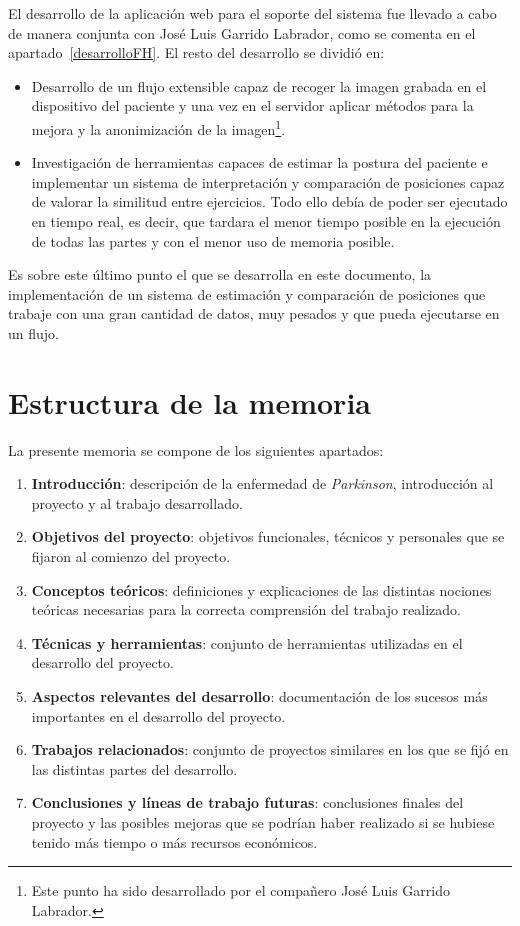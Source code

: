El desarrollo de la aplicación web para el soporte del sistema fue llevado a cabo de manera conjunta con José Luis Garrido Labrador, como se comenta en el apartado~\ref{desarrolloFH}. El resto del desarrollo se dividió en:
\begin{itemize}
	\item Desarrollo de un flujo extensible capaz de recoger la imagen grabada en el dispositivo del paciente y una vez en el servidor aplicar métodos para la mejora y la anonimización de la imagen\footnote{Este punto ha sido desarrollado por el compañero José Luis Garrido Labrador.}.
	\item Investigación de herramientas capaces de estimar la postura del paciente e implementar un sistema de interpretación y comparación de posiciones capaz de valorar la similitud entre ejercicios. Todo ello debía de poder ser ejecutado en tiempo real, es decir, que tardara el menor tiempo posible en la ejecución de todas las partes y con el menor uso de memoria posible.
\end{itemize}

Es sobre este último punto el que se desarrolla en este documento, la implementación de un sistema de estimación y comparación de posiciones que trabaje con una gran cantidad de datos, muy pesados y que pueda ejecutarse en un flujo.

\section{Estructura de la memoria}
La presente memoria se compone de los siguientes apartados:
\begin{enumerate}
	\item \textbf{Introducción}: descripción de la enfermedad de \textit{Parkinson}, introducción al proyecto y al trabajo desarrollado.
	\item \textbf{Objetivos del proyecto}: objetivos funcionales, técnicos y personales que se fijaron al comienzo del proyecto.
	\item \textbf{Conceptos teóricos}: definiciones y explicaciones de las distintas nociones teóricas necesarias para la correcta comprensión del trabajo realizado.
	\item \textbf{Técnicas y herramientas}: conjunto de herramientas utilizadas en el desarrollo del proyecto.
	\item \textbf{Aspectos relevantes del desarrollo}: documentación de los sucesos más importantes en el desarrollo del proyecto.
	\item \textbf{Trabajos relacionados}: conjunto de proyectos similares en los que se fijó en las distintas partes del desarrollo.
	\item \textbf{Conclusiones y líneas de trabajo futuras}: conclusiones finales del proyecto y las posibles mejoras que se podrían haber realizado si se hubiese tenido más tiempo o más recursos económicos.
\end{enumerate}

